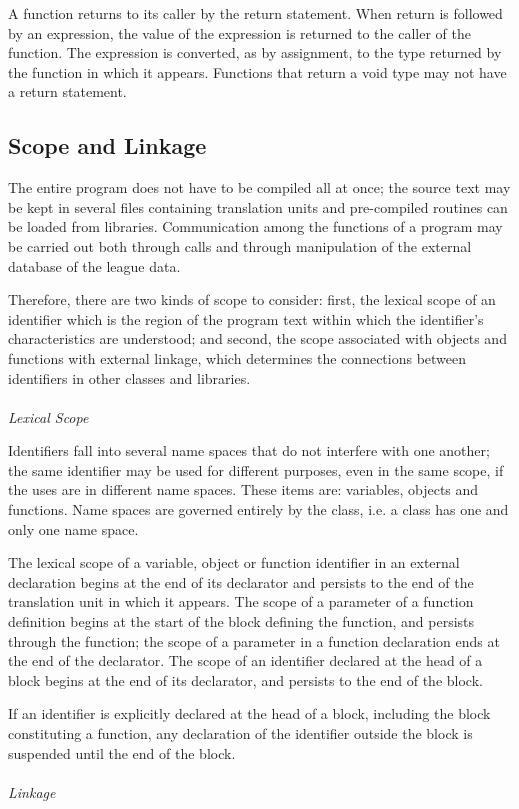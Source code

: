 \documentclass[12pt]{report}
\begin{document}
A function returns to its caller by the return statement. When return is followed by an expression, the value of the expression is returned to the caller of the function. The expression is converted, as by assignment, to the type returned by the function in which it appears. Functions that return a void type may not have a return statement.

\subsection{Scope and Linkage}

The entire program does not have to be compiled all at once; the source text may be kept in several files containing translation units and pre-compiled routines can be loaded from libraries. Communication among the functions of a program may be carried out both through calls and through manipulation of the external database of the league data.

Therefore, there are two kinds of scope to consider: first, the lexical scope of an identifier which is the region of the program text within which the identifier's characteristics are understood; and second, the scope associated with objects and functions with external linkage, which determines the connections between identifiers in other classes and libraries.\\
\\
\textit{Lexical Scope}

Identifiers fall into several name spaces that do not interfere with one another; the same identifier may be used for different purposes, even in the same scope, if the uses are in different name spaces. These items are: variables, objects and functions. Name spaces are governed entirely by the class, i.e. a class has one and only one name space.

The lexical scope of a variable, object or function identifier in an external declaration begins at the end of its declarator and persists to the end of the translation unit in which it appears. The scope of a parameter of a function definition begins at the start of the block defining the function, and persists through the function; the scope of a parameter in a function declaration ends at the end of the declarator. The scope of an identifier declared at the head of a block begins at the end of its declarator, and persists to the end of the block. 

If an identifier is explicitly declared at the head of a block, including the block constituting a function, any declaration of the identifier outside the block is suspended until the end of the block.\\
\\
\textit{Linkage}
\end{document}
